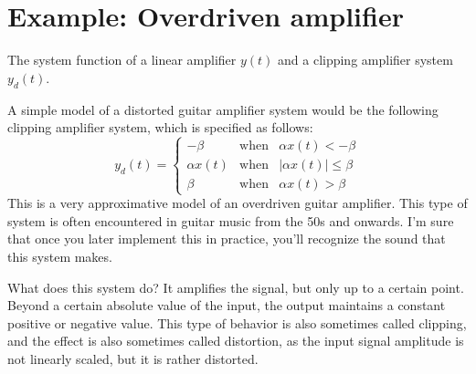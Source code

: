 \section{Example: Overdriven amplifier}
\begin{marginfigure}
   \caption{The system function of a linear amplifier $y(t)$ and a clipping amplifier system $y_d(t)$.}
   \label{dist_effect}
\end{marginfigure}

A simple model of a distorted guitar amplifier system would be the
following clipping amplifier system, which is specified as follows:
\begin{equation}
   y_d(t) = \left\{
   \begin{array}{rcr}
      -\beta      & \mathrm{when} & \alpha x(t)<-\beta      \\
      \alpha x(t) & \mathrm{when} & |\alpha x(t)| \le \beta \\
      \beta       & \mathrm{when} & \alpha x(t)>\beta
   \end{array}
   \right.
   \label{clipamp}
\end{equation}
This is a very approximative model of an overdriven guitar
amplifier. This type of system is often encountered in guitar music from the 50s and onwards. 
I'm sure that once you later implement this in practice, you'll recognize the sound that this system makes.

What does this system do? It amplifies the signal, but only up to a certain point. 
Beyond a certain absolute value of the input, the output maintains a constant positive or negative value. 
This type of behavior is also sometimes called clipping, and the effect is
also sometimes called distortion, as the input signal amplitude is not linearly scaled, 
but it is rather distorted.

